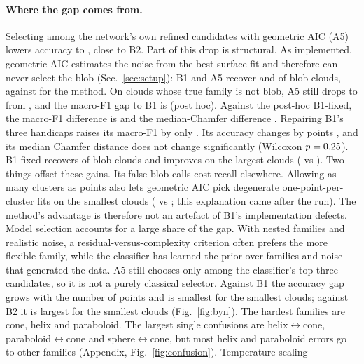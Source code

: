 \begin{table}[H]
\centering
\caption{Preregistered hypotheses and post-hoc checks. p-values of H1, H2 and H5b are Holm-corrected over these three synthetic comparisons (H1: normal approximation from the paired cluster-bootstrap standard error; H2, H5b: Wilcoxon signed-rank on per-chunk mean differences); ``$<$ 1e-16'' is a display floor. Rows marked post hoc are outside the Holm family. H3 uses the subsample-majority coarse label, an exact binomial CI and a 10{,}000-permutation null over predicted coarse labels.}
\label{tab:hypotheses}

\end{table}

\paragraph{Where the gap comes from.} Selecting among the network's own refined candidates with geometric AIC (A5) lowers accuracy to \accAfivegaic{}, close to B2. Part of this drop is structural. As implemented, geometric AIC estimates the noise from the best surface fit and therefore can never select the blob (Sec.~\ref{sec:setup}): B1 and A5 recover \blobRecallBone{} and \blobRecallAfivegaic{} of blob clouds, against \blobRecallMethod{} for the method. On clouds whose true family is not blob, A5 still drops to \nonblobAccAfivegaic{} from \nonblobAccMethod{}, and the macro-F1 gap to B1 is \estHoneNonblob{} \ciHoneNonblob{} (post hoc). Against the post-hoc B1-fixed, the macro-F1 difference is \estHoneBonefixed{} \ciHoneBonefixed{} and the median-Chamfer difference \estHtwoBonefixed{} \ciHtwoBonefixed{}. Repairing B1's three handicaps raises its macro-F1 by only \estFoneBonefixedVsBone{} \ciFoneBonefixedVsBone{}. Its accuracy changes by \estAccBonefixedVsBone{} points \ciAccBonefixedVsBone{}, and its median Chamfer distance does not change significantly (Wilcoxon $p=0.25{}$). B1-fixed recovers \blobRecallBonefixed{} of blob clouds and improves on the largest clouds (\accNlastBonefixed{} vs \accNlastBone{}). Two things offset these gains. Its false blob calls cost recall elsewhere. Allowing as many clusters as points also lets geometric AIC pick degenerate one-point-per-cluster fits on the smallest clouds (\accNfirstBonefixed{} vs \accNfirstBone{}; this explanation came after the run). The method's advantage is therefore not an artefact of B1's implementation defects. Model selection accounts for a large share of the gap. With nested families and realistic noise, a residual-versus-complexity criterion often prefers the more flexible family, while the classifier has learned the prior over families and noise that generated the data. A5 still chooses only among the classifier's top three candidates, so it is not a purely classical selector. Against B1 the accuracy gap grows with the number of points and is smallest for the smallest clouds; against B2 it is largest for the smallest clouds (Fig.~\ref{fig:byn}). The hardest families are cone, helix and paraboloid. The largest single confusions are helix$\leftrightarrow$cone, paraboloid$\leftrightarrow$cone and sphere$\leftrightarrow$cone, but most helix and paraboloid errors go to other families (Appendix, Fig.~\ref{fig:confusion}). Temperature scaling 